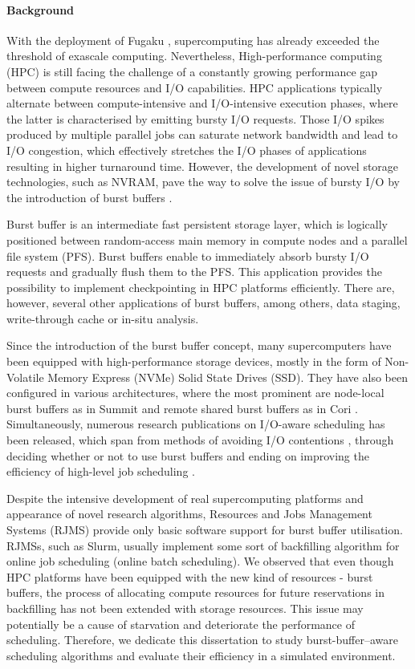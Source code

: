 \documentclass[thesis-en.tex]{subfiles}
\begin{document}
\paragraph{Background}
With the deployment of Fugaku \cite{dongarra2020report}, supercomputing has already exceeded the threshold of exascale computing. Nevertheless, High-performance computing (HPC) is still facing the challenge of a constantly growing performance gap between compute resources and I/O capabilities. HPC applications typically alternate between compute-intensive and I/O-intensive execution phases, where the latter is characterised by emitting bursty I/O requests. Those I/O spikes produced by multiple parallel jobs can saturate network bandwidth and lead to I/O congestion, which effectively stretches the I/O phases of applications resulting in higher turnaround time. However, the development of novel storage technologies, such as NVRAM, pave the way to solve the issue of bursty I/O by the introduction of burst buffers \cite{6232369}.

Burst buffer is an intermediate fast persistent storage layer, which is logically positioned between random-access main memory in compute nodes and a parallel file system (PFS). Burst buffers enable to immediately absorb bursty I/O requests and gradually flush them to the PFS. This application provides the possibility to implement checkpointing in HPC platforms efficiently. There are, however, several other applications of burst buffers, among others, data staging, write-through cache or in-situ analysis.

Since the introduction of the burst buffer concept, many supercomputers have been equipped with high-performance storage devices, mostly in the form of Non-Volatile Memory Express (NVMe) Solid State Drives (SSD). They have also been configured in various architectures, where the most prominent are node-local burst buffers as in Summit \cite{osti_1489443} and remote shared burst buffers as in Cori \cite{bhimji2016accelerating}. Simultaneously, numerous research publications on I/O-aware scheduling has been released, which span from methods of avoiding I/O contentions \cite{7307592,10.1145/2907294.2907316}, through deciding whether or not to use burst buffers \cite{8752797} and ending on improving the efficiency of high-level job scheduling \cite{10.1145/3307681.3325401}. 

Despite the intensive development of real supercomputing platforms and appearance of novel research algorithms, Resources and Jobs Management Systems (RJMS) provide only basic software support for burst buffer utilisation. RJMSs, such as Slurm, usually implement some sort of backfilling algorithm for online job scheduling (online batch scheduling). We observed that even though HPC platforms have been equipped with the new kind of resources - burst buffers, the process of allocating compute resources for future reservations in backfilling has not been extended with storage resources. This issue may potentially be a cause of starvation and deteriorate the performance of scheduling. Therefore, we dedicate this dissertation to study burst-buffer--aware scheduling algorithms and evaluate their efficiency in a simulated environment.
\end{document}
